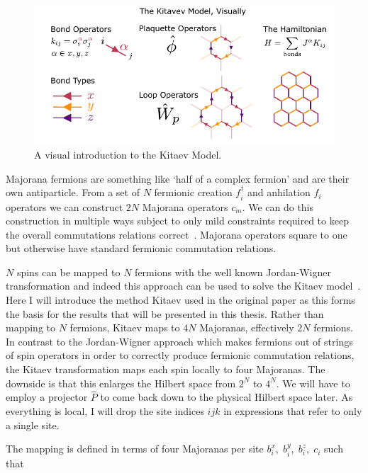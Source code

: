 \hypertarget{fig:visual_kitaev_1}{%
\begin{figure}
\centering
\includegraphics[width=1\textwidth,height=\textheight]{figure_code/amk_chapter/visual_kitaev_1}
\caption[{A Visual Intro to the Kitaev Model}]{A visual introduction to the Kitaev Model.}
\label{fig:visual_kitaev_1}
\end{figure}
}

Majorana fermions are something like `half of a complex fermion' and are their own antiparticle. From a set of \(N\) fermionic creation \(f_i^\dagger\) and anhilation \(f_i\) operators we can construct \(2N\) Majorana operators \(c_m\). We can do this construction in multiple ways subject to only mild constraints required to keep the overall commutations relations correct~\autocite{kitaevAnyonsExactlySolved2006}. Majorana operators square to one but otherwise have standard fermionic commutation relations.

\(N\) spins can be mapped to \(N\) fermions with the well known Jordan-Wigner transformation and indeed this approach can be used to solve the Kitaev model~\autocite{chenExactResultsKitaev2008}. Here I will introduce the method Kitaev used in the original paper as this forms the basis for the results that will be presented in this thesis. Rather than mapping to \(N\) fermions, Kitaev maps to \(4N\) Majoranas, effectively \(2N\) fermions. In contrast to the Jordan-Wigner approach which makes fermions out of strings of spin operators in order to correctly produce fermionic commutation relations, the Kitaev transformation maps each spin locally to four Majoranas. The downside is that this enlarges the Hilbert space from \(2^N\) to \(4^N\). We will have to employ a projector \(\hat{P}\) to come back down to the physical Hilbert space later. As everything is local, I will drop the site indices \(ijk\) in expressions that refer to only a single site.

The mapping is defined in terms of four Majoranas per site \(b_i^x,\;b_i^y,\;b_i^z,\;c_i\) such that

